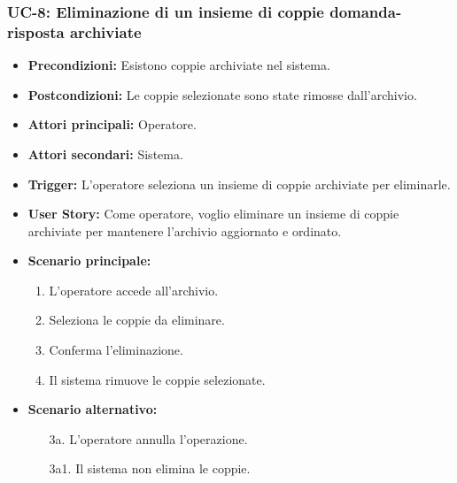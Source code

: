 \documentclass[a4paper, 12pt]{article}
\begin{document}
\subsubsection{UC-8: Eliminazione di un insieme di coppie domanda-risposta archiviate}
\begin{itemize}
    \item \textbf{Precondizioni:} Esistono coppie archiviate nel sistema.
    \item \textbf{Postcondizioni:} Le coppie selezionate sono state rimosse dall'archivio.
    \item \textbf{Attori principali:} Operatore.
    \item \textbf{Attori secondari:} Sistema.
    \item \textbf{Trigger:} L'operatore seleziona un insieme di coppie archiviate per eliminarle.
    \item \textbf{User Story:} Come operatore, voglio eliminare un insieme di coppie archiviate per mantenere l'archivio aggiornato e ordinato.
    \item \textbf{Scenario principale:}
    \begin{enumerate}
        \item L'operatore accede all'archivio.
        \item Seleziona le coppie da eliminare.
        \item Conferma l'eliminazione.
        \item Il sistema rimuove le coppie selezionate.
    \end{enumerate}
    \item \textbf{Scenario alternativo:}
    \begin{enumerate}
        \item[3a.] L'operatore annulla l'operazione.
        \item[3a1.] Il sistema non elimina le coppie.
    \end{enumerate}
\end{itemize}
\end{document}
